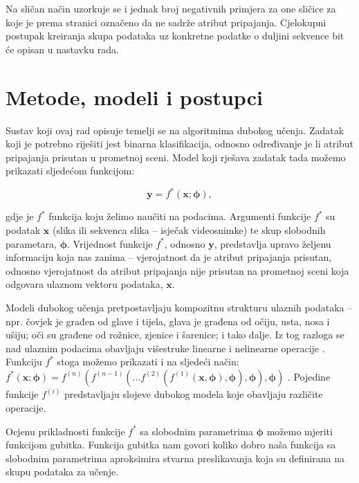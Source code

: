 \documentclass[times, utf8, diplomski, numeric]{fer}
\begin{document}
\noindent Na sličan način uzorkuje se i jednak broj negativnih primjera za one sličice za koje je prema stranici \citep{url:ftts_irap} označeno da ne sadrže atribut pripajanja.
Cjelokupni postupak kreiranja skupa podataka uz konkretne podatke o duljini sekvence bit će opisan u nastavku rada.

\chapter{Metode, modeli i postupci} \label{chapter:methods}
Sustav koji ovaj rad opisuje temelji se na algoritmima dubokog učenja. 
Zadatak koji je potrebno riješiti jest binarna klasifikacija, odnosno određivanje je li atribut pripajanja prisutan u prometnoj sceni.
Model koji rješava zadatak tada možemo prikazati sljedećom funkcijom:

\begin{equation}
 \mathbf{y} = f^*(\mathbf{x}; \boldsymbol{\phi}),
\end{equation}

\noindent gdje je $f^*$ funkcija koju želimo naučiti na podacima. Argumenti funkcije $f^*$ su podatak $\mathbf{x}$ (slika ili sekvenca slika -- isječak videosnimke) te skup slobodnih parametara, $\boldsymbol{\phi}$.
Vrijednost funkcije $f^*$, odnosno $\mathbf{y}$, predstavlja upravo željenu informaciju koja nas zanima -- vjerojatnost da je atribut pripajanja prisutan, odnosno vjerojatnost da atribut pripajanja nije prisutan na prometnoj sceni koja odgovara ulaznom vektoru podataka, $\mathbf{x}$.

Modeli dubokog učenja pretpostavljaju kompozitnu strukturu ulaznih podataka -- npr. čovjek je građen od glave i tijela, glava je građena od očiju, usta, nosa i ušiju; oči su građene od rožnice, zjenice i šarenice; i tako dalje.
Iz tog razloga se nad ulaznim podacima obavljaju višestruke linearne i nelinearne operacije \citep{pdf:duboko_0}.
Funkciju $f^*$ stoga možemo prikazati i na sljedeći način:
$f^*(\mathbf{x}; \boldsymbol{\phi})=f^{(n)}(f^{(n-1)}(...f^{(2)}(f^{(1)}(\mathbf{x}, \boldsymbol{\phi}), \boldsymbol{\phi}), \boldsymbol{\phi}), \boldsymbol{\phi})$ \citep{book:deeplearningbook}.
Pojedine funkcije $f^{(i)}$ predstavljaju slojeve dubokog modela koje obavljaju različite operacije.

Ocjenu prikladnosti funkcije $f^*$ sa slobodnim parametrima $\boldsymbol{\phi}$ možemo mjeriti funkcijom gubitka. 
Funkcija gubitka nam govori koliko dobro naša funkcija sa slobodnim parametrima aproksimira stvarna preslikavanja koja su definirana na skupu podataka za učenje.
\end{document}
